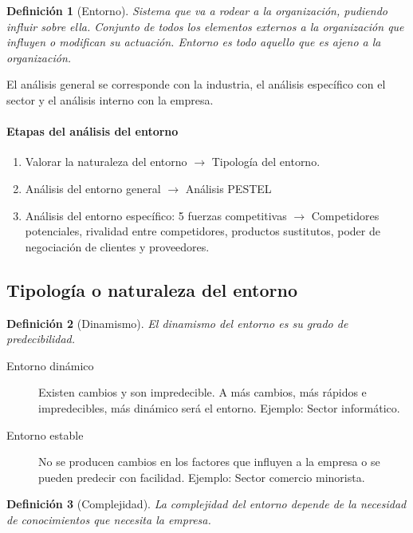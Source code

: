 \documentclass[12pt]{article}
\theoremstyle{definition_wo_parentheses}
\newtheorem{definicion}{Definición}[section]
\begin{document}
\begin{definicion}[Entorno]
	Sistema que va a rodear a la organización, pudiendo influir sobre ella. Conjunto de todos los elementos externos a la organización que influyen o modifican su actuación. Entorno es todo aquello que es ajeno a la organización.
\end{definicion}

	El análisis general se corresponde con la industria, el análisis específico con el sector y el análisis interno con la empresa.

\paragraph{Etapas del análisis del entorno}
\begin{enumerate}
\item Valorar la naturaleza del entorno $\rightarrow$ Tipología del entorno.
\item Análisis del entorno general $\rightarrow$ Análisis PESTEL
\item Análisis del entorno específico: 5 fuerzas competitivas $\rightarrow$ Competidores potenciales, rivalidad entre competidores, productos sustitutos, poder de negociación de clientes y proveedores.
\end{enumerate}

\subsection{Tipología  o naturaleza del entorno}

\begin{definicion}[Dinamismo]
El dinamismo del entorno es su grado de predecibilidad.
\end{definicion}

\begin{description}
\item[Entorno dinámico] Existen cambios y son impredecible. A más cambios, más rápidos e impredecibles, más dinámico será el entorno. Ejemplo: Sector informático.
\item[Entorno estable] No se producen cambios en los factores que influyen a la empresa o se pueden predecir con facilidad. Ejemplo: Sector comercio minorista.
\end{description}

\begin{definicion}[Complejidad]
La complejidad del entorno depende de la necesidad de conocimientos que necesita la empresa.
\end{definicion}
\end{document}

